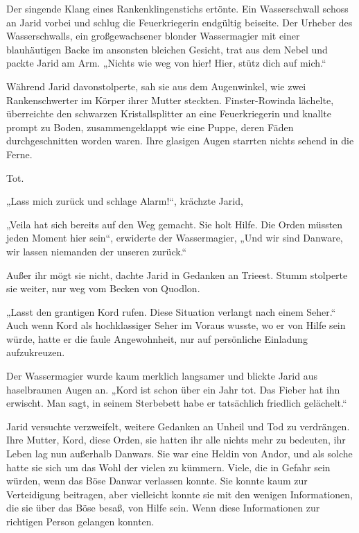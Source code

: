 Der singende Klang eines Rankenklingenstichs ertönte. Ein Wasserschwall schoss an Jarid vorbei und schlug die Feuerkriegerin endgültig beiseite. Der Urheber des Wasserschwalls, ein großgewachsener blonder Wassermagier mit einer blauhäutigen Backe im ansonsten bleichen Gesicht, trat aus dem Nebel und packte Jarid am Arm. „Nichts wie weg von hier! Hier, stütz dich auf mich.“

Während Jarid davonstolperte, sah sie aus dem Augenwinkel, wie zwei Rankenschwerter im Körper ihrer Mutter steckten. Finster-Rowinda lächelte, überreichte den schwarzen Kristallsplitter an eine Feuerkriegerin und knallte prompt zu Boden, zusammengeklappt wie eine Puppe, deren Fäden durchgeschnitten worden waren. Ihre glasigen Augen starrten nichts sehend in die Ferne.

Tot.



\trennzeichen



„Lass mich zurück und schlage Alarm!“, krächzte Jarid,

„Veila hat sich bereits auf den Weg gemacht. Sie holt Hilfe. Die Orden müssten jeden Moment hier sein“, erwiderte der Wassermagier, „Und wir sind Danware, wir lassen niemanden der unseren zurück.“

Außer ihr mögt sie nicht, dachte Jarid in Gedanken an Trieest. Stumm stolperte sie weiter, nur weg vom Becken von Quodlon.

„Lasst den grantigen Kord rufen. Diese Situation verlangt nach einem Seher.“ Auch wenn Kord als hochklassiger Seher im Voraus wusste, wo er von Hilfe sein würde, hatte er die faule Angewohnheit, nur auf persönliche Einladung aufzukreuzen.

Der Wassermagier wurde kaum merklich langsamer und blickte Jarid aus haselbraunen Augen an. „Kord ist schon über ein Jahr tot. Das Fieber hat ihn erwischt. Man sagt, in seinem Sterbebett habe er tatsächlich friedlich gelächelt.“

Jarid versuchte verzweifelt, weitere Gedanken an Unheil und Tod zu verdrängen. Ihre Mutter, Kord, diese Orden, sie hatten ihr alle nichts mehr zu bedeuten, ihr Leben lag nun außerhalb Danwars. Sie war eine Heldin von Andor, und als solche hatte sie sich um das Wohl der vielen zu kümmern. Viele, die in Gefahr sein würden, wenn das Böse Danwar verlassen konnte. Sie konnte kaum zur Verteidigung beitragen, aber vielleicht konnte sie mit den wenigen Informationen, die sie über das Böse besaß, von Hilfe sein. Wenn diese Informationen zur richtigen Person gelangen konnten.

